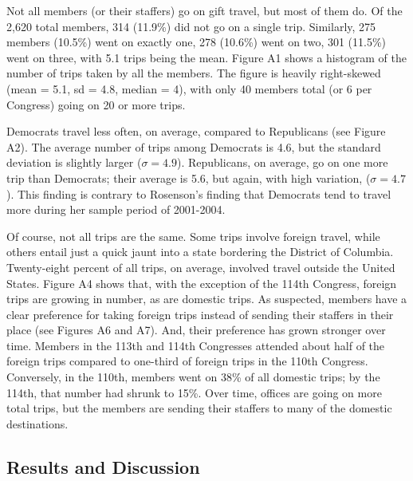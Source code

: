 \documentclass[12pt]{article}                           %
\begin{document}
Not all members (or their staffers) go on gift travel, but most of them do. Of the 2,620 total members, 314 (11.9\%) did not go on a single trip. Similarly, 275 members (10.5\%) went on exactly one, 278 (10.6\%) went on two, 301 (11.5\%) went on three, with 5.1 trips being the mean. Figure A1 shows a histogram of the number of trips taken by all the members. The figure is heavily right-skewed (mean = 5.1, sd = 4.8, median = 4), with only 40 members total (or 6 per Congress) going on 20 or more trips.

Democrats travel less often, on average, compared to Republicans (see Figure A2). The average number of trips among Democrats is 4.6, but the standard deviation is slightly larger ($\sigma = 4.9$). Republicans, on average, go on one more trip than Democrats; their average is 5.6, but again, with high variation, ($\sigma = 4.7$). This finding is contrary to Rosenson's finding that Democrats tend to travel more during her sample period of 2001-2004.

Of course, not all trips are the same. Some trips involve foreign travel, while others entail just a quick jaunt into a state bordering the District of Columbia. Twenty-eight percent of all trips, on average, involved travel outside the United States. Figure A4 shows that, with the exception of the 114th Congress, foreign trips are growing in number, as are domestic trips. As suspected, members have a clear preference for taking foreign trips instead of sending their staffers in their place (see Figures A6 and A7). And, their preference has grown stronger over time. Members in the 113th and 114th Congresses attended about half of the foreign trips compared to one-third of foreign trips in the 110th Congress. Conversely, in the 110th, members went on 38\% of all domestic trips; by the 114th, that number had shrunk to 15\%. Over time, offices are going on more total trips, but the members are sending their staffers to many of the domestic destinations.

\subsection*{\centering Results and Discussion}
\end{document}
